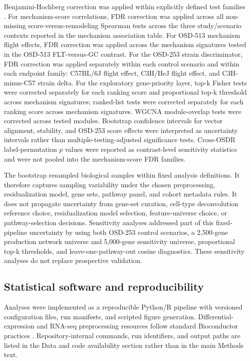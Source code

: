 \documentclass[11pt]{article}
\begin{document}
Benjamini-Hochberg correction was applied within explicitly defined test families \citep{benjamini1995controlling}. For mechanism-score correlations, FDR correction was applied across all non-missing score-versus-remodeling Spearman tests across the three study/scenario contexts reported in the mechanism association table. For OSD-513 mechanism flight effects, FDR correction was applied across the mechanism signatures tested in the OSD-513 FLT-versus-GC contrast. For the OSD-253 strain discriminator, FDR correction was applied separately within each control scenario and within each endpoint family: C57BL/6J flight effect, C3H/HeJ flight effect, and C3H-minus-C57 strain delta. For the exploratory gene-priority layer, top-k Fisher tests were corrected separately for each ranking score and proportional top-k threshold across mechanism signatures; ranked-list tests were corrected separately for each ranking score across mechanism signatures. WGCNA module-overlap tests were corrected across tested modules. Bootstrap confidence intervals for vector alignment, stability, and OSD-253 score effects were interpreted as uncertainty intervals rather than multiple-testing-adjusted significance tests. Cross-OSDR label-permutation $p$ values were reported as contrast-level sensitivity statistics and were not pooled into the mechanism-score FDR families.

The bootstrap resampled biological samples within fixed analysis definitions. It therefore captures sampling variability under the chosen preprocessing, residualization model, gene sets, pathway panel, and cohort metadata rules. It does not propagate uncertainty from gene-set curation, cell-type deconvolution reference choice, residualization model selection, feature-universe choice, or pathway-selection decisions. Sensitivity analyses addressed part of this fixed-pipeline uncertainty by using both OSD-253 control scenarios, a 2,500-gene production network universe and 5,000-gene sensitivity universe, proportional top-k thresholds, and leave-one-pathway-out cosine diagnostics. These sensitivity analyses do not replace prospective validation.

\subsection{Statistical software and reproducibility}

Analyses were implemented as a reproducible Python/R pipeline with versioned configuration files, run manifests, and scripted figure generation. Differential-expression and RNA-seq preprocessing resources follow standard Bioconductor practices \citep{ritchie2015limma,love2014deseq2,robinson2010edger}. Repository-internal commands, run identifiers, and output paths are listed in the Data and code availability section rather than in the main Methods text.
\end{document}
